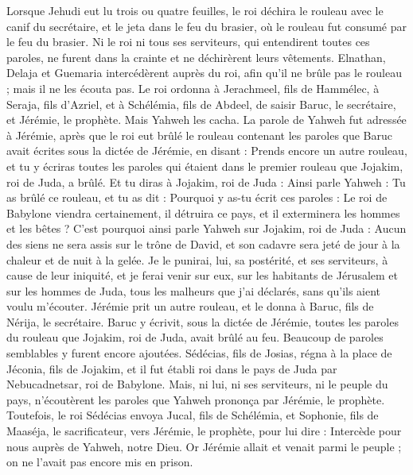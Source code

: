 \begin{multicols}{2}
Lorsque Jehudi eut lu trois ou quatre feuilles, le roi déchira le rouleau avec le canif du secrétaire, et le jeta dans le feu du brasier, où le rouleau fut consumé par le feu du brasier.
Ni le roi ni tous ses serviteurs, qui entendirent toutes ces paroles, ne furent dans la crainte et ne déchirèrent leurs vêtements.
Elnathan, Delaja et Guemaria intercédèrent auprès du roi, afin qu'il ne brûle pas le rouleau ; mais il ne les écouta pas.
Le roi ordonna à Jerachmeel, fils de Hammélec, à Seraja, fils d’Azriel, et à Schélémia, fils de Abdeel, de saisir Baruc, le secrétaire, et Jérémie, le prophète. Mais Yahweh les cacha.
La parole de Yahweh fut adressée à Jérémie, après que le roi eut brûlé le rouleau contenant les paroles que Baruc avait écrites sous la dictée de Jérémie, en disant :
Prends encore un autre rouleau, et tu y écriras toutes les paroles qui étaient dans le premier rouleau que Jojakim, roi de Juda, a brûlé.
Et tu diras à Jojakim, roi de Juda : Ainsi parle Yahweh : Tu as brûlé ce rouleau, et tu as dit : Pourquoi y as-tu écrit ces paroles : Le roi de Babylone viendra certainement, il détruira ce pays, et il exterminera les hommes et les bêtes ?
C'est pourquoi ainsi parle Yahweh sur Jojakim, roi de Juda : Aucun des siens ne sera assis sur le trône de David, et son cadavre sera jeté de jour à la chaleur et de nuit à la gelée.
Je le punirai, lui, sa postérité, et ses serviteurs, à cause de leur iniquité, et je ferai venir sur eux, sur les habitants de Jérusalem et sur les hommes de Juda, tous les malheurs que j’ai déclarés, sans qu’ils aient voulu m’écouter.
Jérémie prit un autre rouleau, et le donna à Baruc, fils de Nérija, le secrétaire. Baruc y écrivit, sous la dictée de Jérémie, toutes les paroles du rouleau que Jojakim, roi de Juda, avait brûlé au feu. Beaucoup de paroles semblables y furent encore ajoutées.
\VerseOne{}Sédécias, fils de Josias, régna à la place de Jéconia, fils de Jojakim, et il fut établi roi dans le pays de Juda par Nebucadnetsar, roi de Babylone.
Mais, ni lui, ni ses serviteurs, ni le peuple du pays, n'écoutèrent les paroles que Yahweh prononça par Jérémie, le prophète.
Toutefois, le roi Sédécias envoya Jucal, fils de Schélémia, et Sophonie, fils de Maaséja, le sacrificateur, vers Jérémie, le prophète, pour lui dire : Intercède pour nous auprès de Yahweh, notre Dieu.
Or Jérémie allait et venait parmi le peuple ; on ne l'avait pas encore mis en prison.

\end{multicols}
